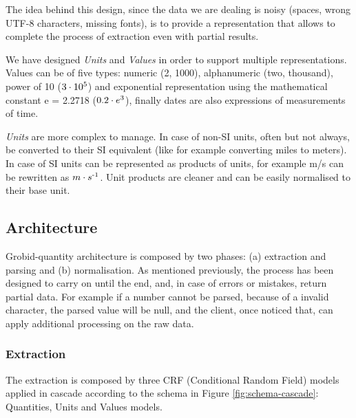 \documentclass[sigconf]{acmart}
\begin{document}
The idea behind this design, since the data we are dealing is noisy (spaces, wrong UTF-8 characters, missing fonts), is to provide a representation that allows to complete the process of extraction even with partial results.

We have designed \textit{Units} and \textit{Values} in order to support multiple representations. Values can be of five types: numeric (2, 1000), alphanumeric (two, thousand), power of 10 ($3\cdot10\textsuperscript{5}$) and exponential representation using the mathematical constant e = 2.2718 ($0.2\cdot e\textsuperscript{3}$), finally dates are also expressions of measurements of time. 

\textit{Units} are more complex to manage. In case of non-SI units, often but not always, be converted to their SI equivalent (like for example converting miles to meters). In case of SI units can be represented as products of units, for example m/s can be rewritten as $m \cdot s\textsuperscript{-1}$. Unit products are cleaner and can be easily normalised to their base unit.  

\subsection{Architecture}

Grobid-quantity architecture is composed by two phases: (a) extraction and parsing and (b) normalisation. As mentioned previously, the process has been designed to carry on until the end, and, in case of errors or mistakes, return partial data. For example if a number cannot be parsed, because of a invalid character, the parsed value will be null, and the client, once noticed that, can apply additional processing on the raw data. 


\subsubsection{Extraction}
The extraction is composed by three CRF (Conditional Random Field) models applied in cascade according to the schema in Figure \ref{fig:schema-cascade}: Quantities, Units and Values models. 
\end{document}
